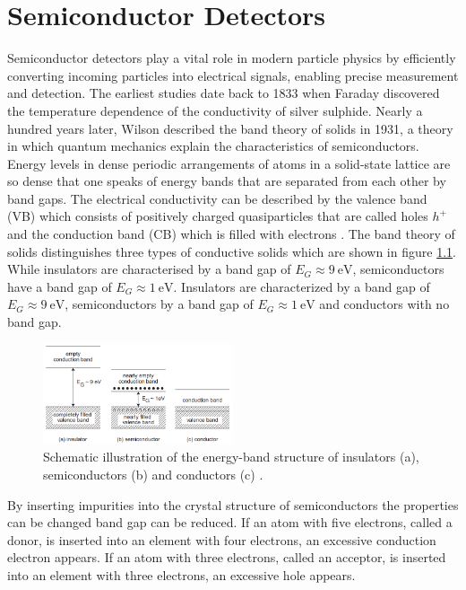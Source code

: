\chapter{Semiconductor Detectors}\label{Semiconductors}

Semiconductor detectors play a vital role in modern particle physics by efficiently converting incoming particles into electrical signals, enabling precise measurement and detection.
The earliest studies date back to 1833 when Faraday discovered the temperature dependence of the conductivity of silver sulphide.
Nearly a hundred years later, Wilson described the band theory of solids in 1931, a theory in which quantum mechanics explain the characteristics of semiconductors.
Energy levels in dense periodic arrangements of atoms in a solid-state lattice are so dense that one speaks of energy bands that are separated from each other by band gaps.
The electrical conductivity can be described by the valence band (VB) which consists of positively charged quasiparticles that are called holes $h^+$ and the conduction band (CB) which is filled with electrons \cite{KolanoskiWermes}.
The band theory of solids distinguishes three types of conductive solids which are shown in figure \ref{fig:bandTheory}.
While insulators are characterised by a band gap of $E_G\approx \SI{9}{\eV}$, semiconductors have a band gap of $E_G\approx \SI{1}{\eV}$.
Insulators are characterized by a band gap of $E_G\approx \SI{9}{\eV}$, semiconductors by a band gap of $E_G\approx \SI{1}{\eV}$ and conductors with no band gap.
\begin{figure}
    \centering
    \includegraphics[width=0.5\textwidth]{figs/BandTheory.png}
    \caption{Schematic illustration of the energy-band structure of insulators (a), semiconductors (b) and conductors (c) \cite{KolanoskiWermes}.}
    \label{fig:bandTheory}
\end{figure}
By inserting impurities into the crystal structure of semiconductors the properties can be changed band gap can be reduced.
If an atom with five electrons, called a donor, is inserted into an element with four electrons, an excessive conduction electron appears.
If an atom with three electrons, called an acceptor, is inserted into an element with three electrons, an excessive hole appears.

